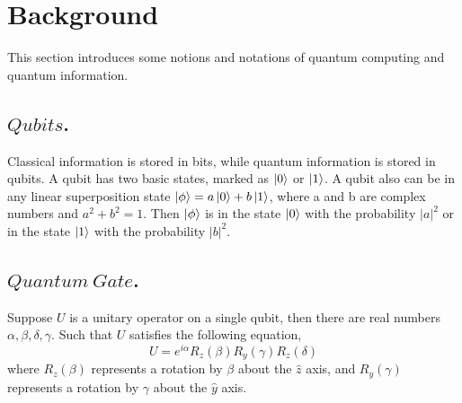 \documentclass[runningheads]{llncs}
\begin{document}
\section{Background}
\label{Background}
This section introduces some notions and notations of quantum computing and quantum information.

\subsection{$Qubits$.}
Classical information is stored in bits, while quantum information is stored in qubits. 
A qubit has two basic states, marked as $\left\vert{0}\right\rangle$ or $\left\vert{1}\right\rangle$. A qubit also can be in any linear superposition state $\left\vert{\phi}\right\rangle=a\left\vert{0}\right\rangle+b\left\vert{1}\right\rangle$, where a and b are complex numbers and $a^{2}+b^{2}=1$. Then $\left\vert{\phi}\right\rangle$ is in the state $\left\vert{0}\right\rangle$ with the probability $|a|^{2}$ or in the state $\left\vert{1}\right\rangle$ with the probability $|b|^{2}$. 
\subsection{$Quantum \ Gate$.}
Suppose $U$ is a unitary operator on a single qubit, then there are real numbers $\alpha, \beta, \delta, \gamma$. Such that $U$ satisfies the following equation,
 \begin{equation}
	U=e^{i\alpha}R_{z}(\beta)R_{y}(\gamma)R_{z}(\delta)
\end{equation}
where $R_{z}(\beta)$ represents a rotation by $\beta$ about the $\hat{z}$ axis, 
and $R_{y}(\gamma)$ represents a rotation by $\gamma$ about the $\hat{y}$ axis.
\end{document}
